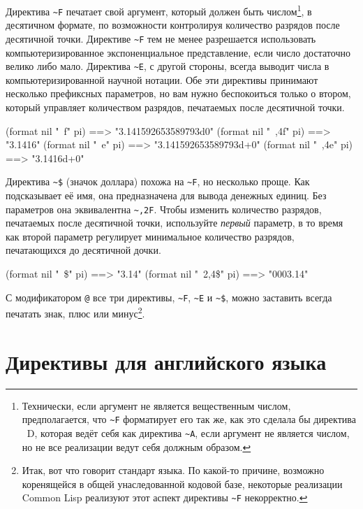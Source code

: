 Директива \lstinline!~F! печатает свой аргумент, который должен быть
числом\footnote{Технически, если аргумент не является вещественным числом, предполагается,
  что \lstinline!~F! форматирует его так же, как это сделала бы директива ~D, которая
  ведёт себя как директива \lstinline!~A!, если аргумент не является числом, но не все
  реализации ведут себя должным образом.}, в десятичном формате, по возможности
контролируя количество разрядов после десятичной точки. Директиве \lstinline!~F! тем не
менее разрешается использовать компьютеризированное экспоненциальное представление, если
число достаточно велико либо мало. Директива \lstinline!~E!, с другой стороны, всегда
выводит числа в компьютеризированной научной нотации. Обе эти директивы принимают
несколько префиксных параметров, но вам нужно беспокоиться только о втором, который
управляет количеством разрядов, печатаемых после десятичной точки.

\begin{myverb}
(format nil "~f" pi)   ==> "3.141592653589793d0"
(format nil "~,4f" pi) ==> "3.1416"
(format nil "~e" pi)   ==> "3.141592653589793d+0"
(format nil "~,4e" pi) ==> "3.1416d+0"
\end{myverb}

Директива \lstinline!~$! (значок доллара) похожа на \lstinline!~F!, но несколько
проще. Как подсказывает её имя, она предназначена для вывода денежных единиц. Без
параметров она эквивалентна \lstinline!~,2F!. Чтобы изменить количество разрядов,
печатаемых после десятичной точки, используйте \textit{первый} параметр, в то время как
второй параметр регулирует минимальное количество разрядов, печатающихся до десятичной
дочки.%

\begin{myverb}
(format nil "~\$" pi) ==> "3.14"
(format nil "~2,4\$" pi) ==> "0003.14"
\end{myverb}

С модификатором \lstinline!@! все три директивы, \lstinline!~F!, \lstinline!~E! и
\lstinline!~$!, можно заставить всегда печатать знак, плюс или минус\footnote{Итак, вот
  что говорит стандарт языка. По какой-то причине, возможно коренящейся в общей
  унаследованной кодовой базе, некоторые реализации Common Lisp реализуют этот аспект
  директивы \lstinline!~F! некорректно.}. %

\section{Директивы для английского языка}
\label{ch18:eng-lang}

